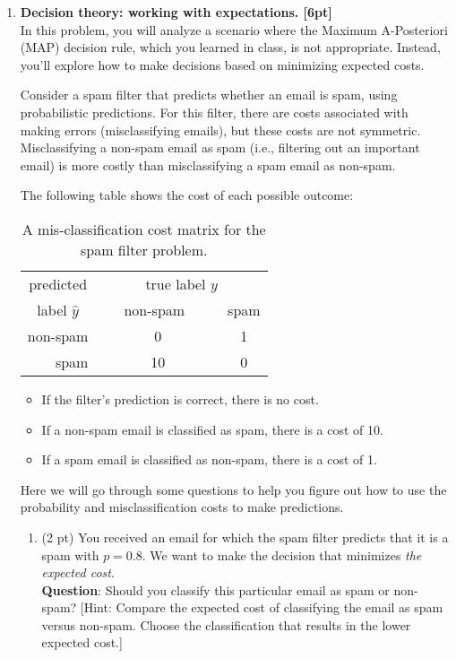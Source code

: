 \documentclass{article}
\begin{document}
\begin{enumerate}
\begin{enumerate}
\end{enumerate}

\item \textbf{Decision theory: working with expectations. [6pt]} \\
In this problem, you will analyze a scenario where the Maximum A-Posteriori (MAP) decision rule, which you learned in class, is not appropriate. Instead, you'll explore how to make decisions based on minimizing expected costs.

Consider a spam filter that predicts whether an email is spam, using probabilistic predictions. For this filter, there are costs associated with making errors (misclassifying emails), but these costs are not symmetric. Misclassifying a non-spam email as spam (i.e., filtering out an important email) is more costly than misclassifying a spam email as non-spam.

The following table shows the cost of each possible outcome:
\begin{table}[!h]
    \centering
 \begin{tabular}{|r|c|c|}\hline
  \multicolumn{1}{|c|}{predicted} & \multicolumn{2}{c|}{true label $y$}\\ \cline{2-3}
 \multicolumn{1}{|c|}{label $\hat{y}$} & \ \ \ non-spam\ \ \ \   & spam \\ \hline
 non-spam     & 0 & 1 \\ \hline
 spam     & 10 &  0 \\ \hline
 \end{tabular}
    \caption{A mis-classification cost matrix for the spam filter problem.}
    \label{tab:my_label}
\end{table}
\begin{center}
\end{center}



\begin{itemize}
\item If the filter's prediction is correct, there is no cost.
\item If a non-spam email is classified as spam, there is a cost of 10.
\item If a spam email is classified as non-spam, there is a cost of 1.
\end{itemize}


Here we will go through some questions to help you figure out how to use the probability and misclassification costs to make predictions.
\begin{enumerate}
    \item (2 pt) You received an email for which the spam filter predicts that it is a spam with $p= 0.8$. We want to make the decision that minimizes \textit{the expected cost}.\\ \textbf{Question}: Should you classify this particular email as spam or non-spam? [Hint: Compare the expected cost of classifying the email as spam versus non-spam. Choose the classification that results in the lower expected cost.]\\


\end{enumerate}
\end{enumerate}
\end{document}
